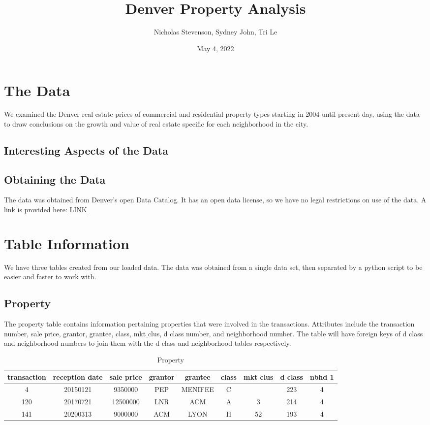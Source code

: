 \documentclass[]{article}
\title{Denver Property Analysis}
\author{Nicholas Stevenson, Sydney John, Tri Le}
\date{May 4, 2022}
\begin{document}
\maketitle
\section{The Data}
We examined the Denver real estate prices of commercial and residential property types starting in 2004 until present day, using the data to draw conclusions on the growth and value of real estate specific for each neighborhood in the city.
\subsection{Interesting Aspects of the Data}
\subsection{Obtaining the Data}
The data was obtained from Denver's open Data Catalog. It has an open data license, so we have no legal restrictions on use of the data. A link is provided here: \href{https://www.denvergov.org/opendata/dataset/city-and-county-of-denver-real-property-sales-and-transfers}{LINK}
\section{Table Information}
We have three tables created from our loaded data. The data was obtained from a single data set, then separated by a python script to be easier and faster to work with.

\subsection{Property}
The property table contains information pertaining properties that were involved in the transactions. Attributes include the transaction number, sale price, grantor, grantee, class, mkt$\_$clus, d class number, and neighborhood number. The table will have foreign keys of d class and neighborhood numbers to join them with the d class and neighborhood tables respectively.

\begin{table}[h!]
	\begin{center}
		\caption{Property}
		\label{tab:table1}
		\begin{tabular}{c|c|c|c|c|c|c|c|c} 
			\textbf{transaction} & \textbf{reception date} & \textbf{sale price} & \textbf{grantor} & \textbf {grantee} & \textbf{class} & \textbf{mkt clus} & \textbf{d class} & \textbf{nbhd 1} \\
			\hline
			4 & 20150121 & 9350000 & PEP & MENIFEE  & C & & 223 & 4 \\
			120 & 20170721 & 12500000 & LNR & ACM & A & 3 & 214 & 4\\
			141 & 20200313 & 9000000 & ACM & LYON & H & 52 & 193 & 4\\
		\end{tabular}
	\end{center}
\end{table}
\end{document}

